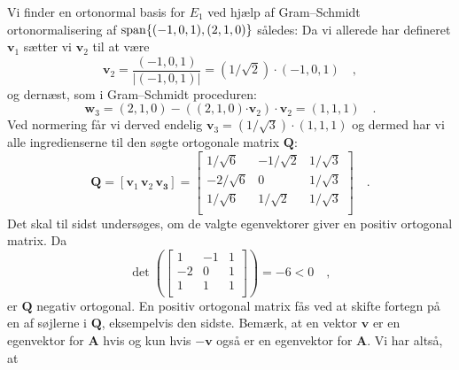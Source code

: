 \begin{example}
Vi finder en ortonormal basis for $E_{1}$ ved hjælp af Gram--Schmidt ortonormalisering af $\mathrm{span}\{ (-1,0,1),  (2,1,0)\}$ således:
Da vi allerede har defineret $\mathbf{v}_{1}$ sætter vi $\mathbf{v}_{2}$ til at være
\begin{equation}
\mathbf{v}_{2} = \frac{(-1,0,1)}{\vert (-1, 0,1) \vert} = (1/\sqrt{2})\cdot(-1,0,1) \quad ,
\end{equation}
og dernæst, som i Gram--Schmidt proceduren:
\begin{equation}
\mathbf{w}_{3} = (2,1,0) - \left((2,1,0)\bm{\cdot}\mathbf{v}_{2}\right)\cdot \mathbf{v}_{2} = (1,1,1) \quad .
\end{equation}
Ved normering får vi derved endelig $\mathbf{v}_{3} = (1/\sqrt{3})\cdot(1,1,1)$ og dermed har vi alle ingredienserne til den søgte ortogonale matrix $\mathbf{Q}$:
\begin{equation}
\mathbf{Q} = [ \mathbf{v}_{1} \, \mathbf{v}_{2} \, \mathbf{{v}_{3}} ] = \left[
                                                            \begin{array}{rrr}
                                                              1/\sqrt{6} & -1/\sqrt{2} & 1/\sqrt{3} \\
                                                              -2/\sqrt{6} & 0 &1/\sqrt{3} \\
                                                              1/\sqrt{6} & 1/\sqrt{2} & 1/\sqrt{3} \\
                                                            \end{array}
                                                          \right] \quad .
\end{equation}
Det skal til sidst undersøges, om de valgte egenvektorer giver en positiv ortogonal matrix. Da
\begin{equation}
\det\left( \left[
             \begin{array}{ccc}
               1 & -1 & 1 \\
               -2 & 0 & 1 \\
               1 & 1 & 1 \\
             \end{array}
           \right] \right) = -6 < 0 \quad,
\end{equation}
er $\mathbf{Q}$ negativ ortogonal. En positiv ortogonal matrix fås ved at skifte fortegn på en af søjlerne i $\mathbf{Q}$, eksempelvis den sidste. Bemærk, at en vektor $\mathbf{v}$ er en egenvektor for $\mathbf{A}$ hvis og kun hvis $-\mathbf{v}$ også er en egenvektor for $\mathbf{A}$. Vi har altså, at

\end{example}
